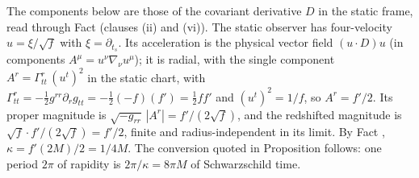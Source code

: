 The components below are those of the covariant derivative $D$ in the static frame, read through Fact  (clauses (ii) and (vi)). The static observer has four-velocity $u = \xi/\sqrt f$ with $\xi = \partial_{t_s}$. Its acceleration is the physical vector field $(u \cdot D)u$ (in components $A^\mu = u^\nu \nabla_\nu u^\mu$); it is radial, with the single component $A^r = \Gamma^r_{tt}\,(u^t)^2$ in the static chart, with $\Gamma^r_{tt} = -\tfrac12 g^{rr}\partial_r g_{tt} = -\tfrac12(-f)(f') = \tfrac12 f f'$ and $(u^t)^2 = 1/f$, so $A^r = f'/2$. Its proper magnitude is $\sqrt{-g_{rr}}\,|A^r| = f'/(2\sqrt f)$, and the redshifted magnitude is $\sqrt f \cdot f'/(2\sqrt f) = f'/2$, finite and radius-independent in its limit. By Fact , $\kappa = f'(2M)/2 = 1/4M$. The conversion quoted in Proposition  follows: one period $2\pi$ of rapidity is $2\pi/\kappa = 8\pi M$ of Schwarzschild time.
